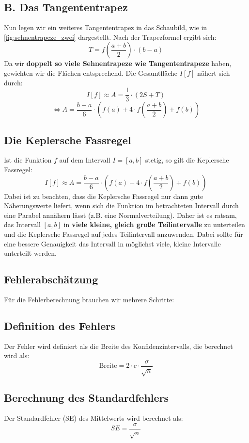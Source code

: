 \subsection*{B. Das Tangententrapez}

Nun legen wir ein weiteres Tangententrapez in das Schaubild, wie in \autoref{fig:sehnentrapeze_zwei} dargestellt. Nach der Trapezformel ergibt sich:
\[
T = f\left(\frac{a + b}{2}\right) \cdot (b - a)
\]
Da wir \textbf{doppelt so viele Sehnentrapeze wie Tangententrapeze} haben, gewichten wir die Flächen entsprechend. Die Gesamtfläche $I[f]$ nähert sich durch:
\[
I[f] \approx A = \frac{1}{3} \cdot (2S + T)
\]
\[
  \Leftrightarrow A = \frac{b - a}{6} \cdot \left(f(a) + 4 \cdot f\left(\frac{a + b}{2}\right) + f(b)\right)
\]

\subsection*{Die Keplersche Fassregel}

Ist die Funktion $f$ auf dem Intervall $I = [a, b]$ stetig, so gilt die Keplersche Fassregel:
\[
I[f] \approx A = \frac{b - a}{6} \cdot \left(f(a) + 4 \cdot f\left(\frac{a + b}{2}\right) + f(b)\right)
\]
Dabei ist zu beachten, dass die Keplersche Fassregel nur dann gute Näherungswerte liefert, wenn sich die Funktion im betrachteten Intervall durch eine Parabel annähern lässt (z.B. eine Normalverteilung). Daher ist es ratsam, das Intervall $[a, b]$ in \textbf{viele kleine, gleich große Teilintervalle} zu unterteilen und die Keplersche Fassregel auf jedes Teilintervall anzuwenden. Dabei sollte für eine bessere Genauigkeit das Intervall in möglichst viele, kleine Intervalle unterteilt werden. \cite{skript}

\subsection{Fehlerabschätzung}
\label{sec:fehlerabschätzung}

Für die Fehlerberechnung brauchen wir mehrere Schritte:
\subsection*{Definition des Fehlers}
Der Fehler wird definiert als die Breite des Konfidenzintervalls, die berechnet wird als:
\[
\text{Breite} = 2 \cdot c \cdot \frac{\sigma}{\sqrt{n}}
\]

\subsection*{Berechnung des Standardfehlers}
Der Standardfehler (SE) des Mittelwerts wird berechnet als:
\[
SE = \frac{\sigma}{\sqrt{n}}
\]

